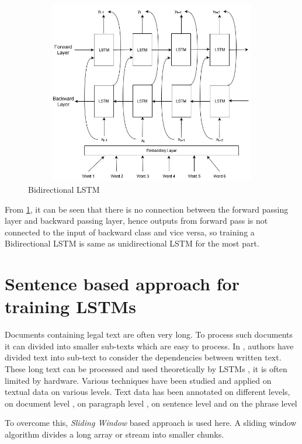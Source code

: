 \begin{figure}[!ht]
    \centering
    \includegraphics[width=12cm,height=8cm,keepaspectratio]{pics/BiLSTM.jpg}
    \captionsetup{justification=centering,margin=2cm}
    \caption{Bidirectional LSTM }
    \label{fig:BiLSTM}
\end{figure}

From \ref{fig:BiLSTM}, it can be seen that there is no connection between the forward passing layer and backward passing layer, hence outputs from forward pass is not connected to the input of backward class and vice versa, so training a Bidirectional LSTM is same as unidirectional LSTM for the most part.


\section{Sentence based approach for training LSTMs} \label{backgroundSlidingWindow}

Documents containing legal text are often very long. To process such documents it can divided into smaller sub-texts which are easy to process. In \cite{volkovich2016text}, authors have divided text into sub-text to consider the dependencies between written text. These long text can be processed and used theoretically by \glspl{LSTM} \cite{hochreiter1997long} , it is often limited by hardware. Various techniques have been studied and applied on textual data on various levels. Text data has been annotated on different levels, on document level \cite{macdonald2006trec}, on paragraph level \cite{ferguson2009exploring}, on sentence level \cite{santos2009integrating, seki2008overview} and on the phrase level \cite{wilson2005recognizing}

To overcome this, \textit{Sliding Window} based approach is used here. A sliding window algorithm divides a long array or stream into smaller chunks.  

